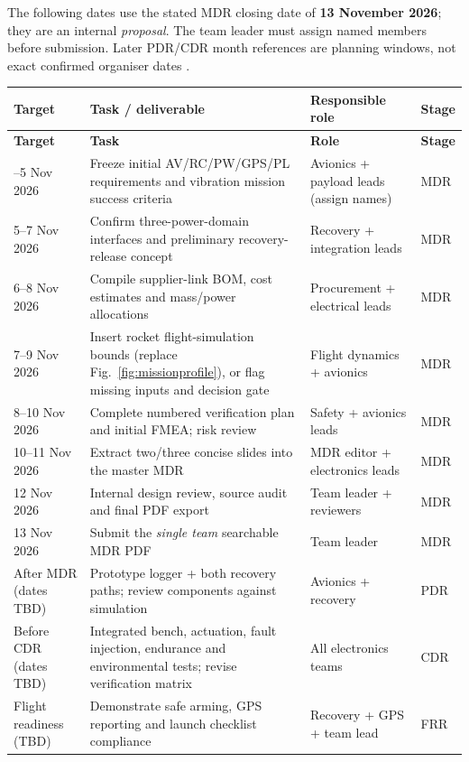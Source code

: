 The following dates use the stated MDR closing date of \textbf{13 November 2026}; they are an internal \emph{proposal}. The team leader must assign named members before submission. Later PDR/CDR month references are planning windows, not exact confirmed organiser dates \cite{rtc2027app01,rtc2027app07}.

\small
\begingroup
{}
\begin{longtable}{@{}L{27mm}L{63mm}L{38mm}L{23mm}@{}}
\toprule{}\textbf{Target}&\textbf{Task / deliverable}&\textbf{Responsible role}&\textbf{Stage}\\\midrule\endfirsthead
\toprule{}\textbf{Target}&\textbf{Task}&\textbf{Role}&\textbf{Stage}\\\midrule\endhead
\bottomrule{}--5 Nov 2026 & Freeze initial AV/RC/PW/GPS/PL requirements and vibration mission success criteria & Avionics + payload leads (assign names) & MDR\\
5--7 Nov 2026 & Confirm three-power-domain interfaces and preliminary recovery-release concept & Recovery + integration leads & MDR\\
6--8 Nov 2026 & Compile supplier-link BOM, cost estimates and mass/power allocations & Procurement + electrical leads & MDR\\
7--9 Nov 2026 & Insert rocket flight-simulation bounds (replace Fig.~\ref{fig:missionprofile}), or flag missing inputs and decision gate & Flight dynamics + avionics & MDR\\
8--10 Nov 2026 & Complete numbered verification plan and initial FMEA; risk review & Safety + avionics leads & MDR\\
10--11 Nov 2026 & Extract two/three concise slides into the master MDR & MDR editor + electronics leads & MDR\\
12 Nov 2026 & Internal design review, source audit and final PDF export & Team leader + reviewers & MDR\\
13 Nov 2026 & Submit the \emph{single team} searchable MDR PDF & Team leader & MDR\\
After MDR (dates TBD) & Prototype logger + both recovery paths; review components against simulation & Avionics + recovery & PDR\\
Before CDR (dates TBD) & Integrated bench, actuation, fault injection, endurance and environmental tests; revise verification matrix & All electronics teams & CDR\\
Flight readiness (TBD) & Demonstrate safe arming, GPS reporting and launch checklist compliance & Recovery + GPS + team lead & FRR\\
\end{longtable}
\endgroup %
\normalsize

